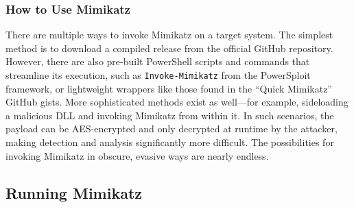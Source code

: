 \documentclass[a4paper]{article}
\newcommand{\abc}{\hfill \break}
\begin{document}
\subsubsection{How to Use Mimikatz}
There are multiple ways to invoke Mimikatz on a target system. The simplest method is to download a compiled release from the official GitHub repository. However, there are also pre-built PowerShell scripts and commands that streamline its execution, such as \texttt{Invoke-Mimikatz} from the PowerSploit framework, or lightweight wrappers like those found in the “Quick Mimikatz” GitHub gists. \cite{noauthor_powershellmafiapowersploit_2025, quick-mimikatz}\abc
More sophisticated methods exist as well—for example, sideloading a malicious DLL and invoking Mimikatz from within it. In such scenarios, the payload can be AES-encrypted and only decrypted at runtime by the attacker, making detection and analysis significantly more difficult. The possibilities for invoking Mimikatz in obscure, evasive ways are nearly endless.
\newpage
\subsection{Running Mimikatz}
\end{document}
